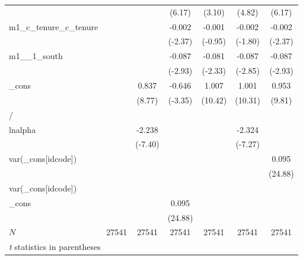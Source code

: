 \begin{tabular}{l*{6}{c}}
            &            &            &      (6.17)&      (3.10)&      (4.82)&      (6.17)\\
m1\_c\_tenure\_c\_tenure&            &            &      -0.002&      -0.001&      -0.002&      -0.002\\
            &            &            &     (-2.37)&     (-0.95)&     (-1.80)&     (-2.37)\\
m1\_\_1\_south &            &            &      -0.087&      -0.081&      -0.087&      -0.087\\
            &            &            &     (-2.93)&     (-2.33)&     (-2.85)&     (-2.93)\\
\_cons      &            &       0.837&      -0.646&       1.007&       1.001&       0.953\\
            &            &      (8.77)&     (-3.35)&     (10.42)&     (10.31)&      (9.81)\\
\hline
/           &            &            &            &            &            &            \\
lnalpha     &            &      -2.238&            &            &      -2.324&            \\
            &            &     (-7.40)&            &            &     (-7.27)&            \\
var(\_cons[idcode])&            &            &            &            &            &       0.095\\
            &            &            &            &            &            &     (24.88)\\
\hline
var(\_cons[idcode])&            &            &            &            &            &            \\
\_cons      &            &            &       0.095&            &            &            \\
            &            &            &     (24.88)&            &            &            \\
\hline
\(N\)       &       27541&       27541&       27541&       27541&       27541&       27541\\
\hline\hline
\multicolumn{7}{l}{\footnotesize \textit{t} statistics in parentheses}\\
\end{tabular}

